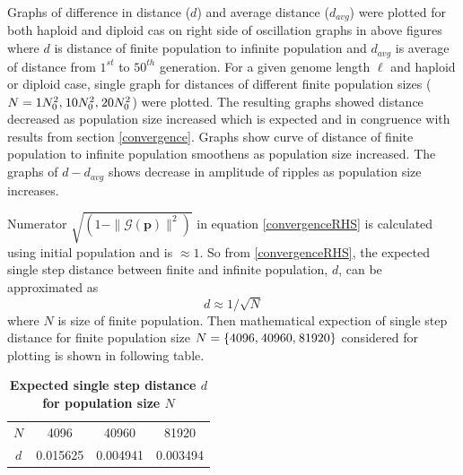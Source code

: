 Graphs of difference in distance ($d$) and  average distance ($d_{avg}$) were plotted for both haploid and diploid cas on right side of
oscillation graphs in above figures where $d$ is distance of finite population to infinite population and $d_{avg}$ is average of distance 
from $1^{st}$ to $50^{th}$ generation. For a given genome length $\ell$ and haploid or diploid case, single graph for distances of 
different finite population sizes ($N = 1N_0^2, \hspace{0.01in}10N_0^2, \hspace{0.01in}20N_0^2$) were plotted. 
The resulting graphs showed distance decreased as population size increased which is expected and in congruence with results from section \ref{convergence}. 
Graphs show curve of distance of finite population to infinite population smoothens as population size increased. The graphs of $d-d_{avg}$ 
shows decrease in amplitude of ripples as population size increases.

Numerator $\sqrt{(1 - \|\mathcal{G}(\bm{p})\|^2)}$ in equation \ref{convergenceRHS} is calculated using initial population and is $\approx 1$. 
So from \ref{convergenceRHS}, the expected single step distance between finite and infinite population, $d$, can be approximated as
\[
d \approx 1/\sqrt{N}
\]
where $N$ is size of finite population.
Then mathematical expection of single step distance for finite population size $N = \{4096, \hspace{0.01in} 40960, \hspace{0.01in} 81920\}$ considered for plotting is shown in following table.
\begin{table}[ht]
\caption{\textbf{Expected single step distance $d$ for population size $N$}}
\centering
\begin{tabular}{c c c c}
\hline
$N$ & 4096 & 40960 & 81920 \\
$d$ & 0.015625 & 0.004941 & 0.003494 \\
\hline
\end{tabular}
\label{tableExpectedDistance}
\end{table}

